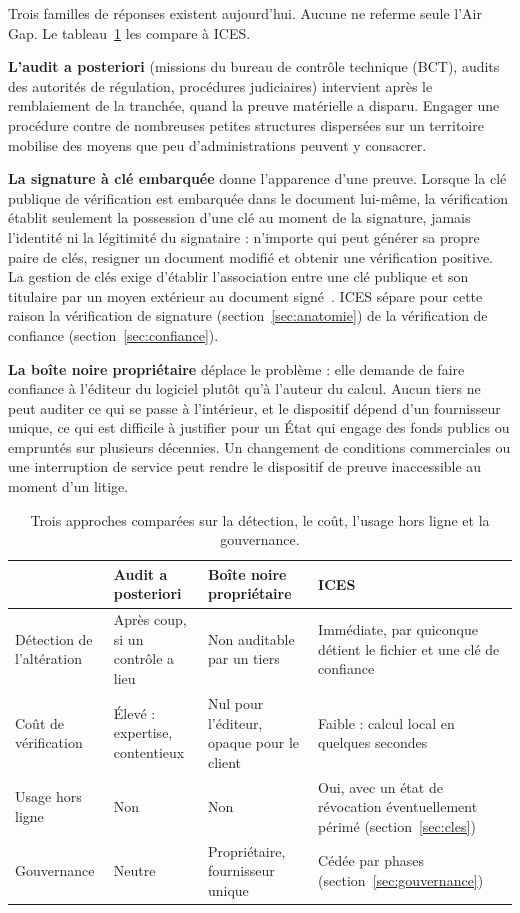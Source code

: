 \documentclass[11pt,a4paper]{article}
\begin{document}
Trois familles de réponses existent aujourd'hui. Aucune ne referme seule l'Air Gap. Le tableau~\ref{tab:approches} les compare à ICES.

\textbf{L'audit a posteriori} (missions du bureau de contrôle technique (BCT), audits des autorités de régulation, procédures judiciaires) intervient après le remblaiement de la tranchée, quand la preuve matérielle a disparu. Engager une procédure contre de nombreuses petites structures dispersées sur un territoire mobilise des moyens que peu d'administrations peuvent y consacrer.

\textbf{La signature à clé embarquée} donne l'apparence d'une preuve. Lorsque la clé publique de vérification est embarquée dans le document lui-même, la vérification établit seulement la possession d'une clé au moment de la signature, jamais l'identité ni la légitimité du signataire : n'importe qui peut générer sa propre paire de clés, resigner un document modifié et obtenir une vérification positive. La gestion de clés exige d'établir l'association entre une clé publique et son titulaire par un moyen extérieur au document signé~\cite{nist80057}. ICES sépare pour cette raison la vérification de signature (section~\ref{sec:anatomie}) de la vérification de confiance (section~\ref{sec:confiance}).

\textbf{La boîte noire propriétaire} déplace le problème : elle demande de faire confiance à l'éditeur du logiciel plutôt qu'à l'auteur du calcul. Aucun tiers ne peut auditer ce qui se passe à l'intérieur, et le dispositif dépend d'un fournisseur unique, ce qui est difficile à justifier pour un État qui engage des fonds publics ou empruntés sur plusieurs décennies. Un changement de conditions commerciales ou une interruption de service peut rendre le dispositif de preuve inaccessible au moment d'un litige.

\begin{table}[H]\centering\small
\caption{Trois approches comparées sur la détection, le coût, l'usage hors ligne et la gouvernance.}\label{tab:approches}
\begin{tabularx}{\linewidth}{@{}p{3.1cm}XXX@{}}
\toprule
& \textbf{Audit a posteriori} & \textbf{Boîte noire propriétaire} & \textbf{ICES} \\
\midrule
Détection de l'altération & Après coup, si un contrôle a lieu & Non auditable par un tiers & Immédiate, par quiconque détient le fichier et une clé de confiance \\
Coût de vérification & Élevé : expertise, contentieux & Nul pour l'éditeur, opaque pour le client & Faible : calcul local en quelques secondes \\
Usage hors ligne & Non & Non & Oui, avec un état de révocation éventuellement périmé (section~\ref{sec:cles}) \\
Gouvernance & Neutre & Propriétaire, fournisseur unique & Cédée par phases (section~\ref{sec:gouvernance}) \\
\bottomrule
\end{tabularx}
\end{table}
\end{document}
